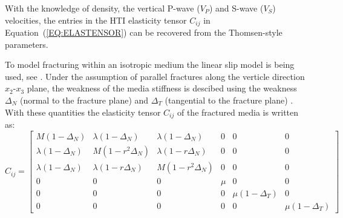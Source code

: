 \documentclass[review,authoryear]{elsarticle}
\begin{document}
With the knowledge of density, the vertical P-wave ($V_{P}$) and S-wave ($V_{S}$) velocities, the entries in the HTI elasticity tensor $C_{ij}$ in Equation~(\ref{EQ:ELASTENSOR}) can be recovered from the Thomsen-style parameters.

To model fracturing within an isotropic medium the linear slip model is being used, see \cite{schoenberg1980elastic}. Under the assumption of parallel fractures
along the verticle direction $x_{2}$-$x_{3}$ plane, the weakness of the media stiffness is descibed using the weakness $\Delta_N$ (normal to the fracture plane) and $\Delta_T$ (tangential to the fracture plane) \citep{bakulin2000estimation}. With these quantities the elasticity tensor $C_{ij}$ of the fractured media is written as:
\begin{equation}\label{EQ:FRACTENSOR}
  C_{ij} = \left[
  \begin{array}{cccccc}
M(1-\Delta_N) & \lambda(1-\Delta_N) & \lambda(1-\Delta_N) & 0 & 0 & 0 \\
\lambda(1-\Delta_N) & M(1-r^2\Delta_N) & \lambda(1-r\Delta_N) & 0 & 0 & 0 \\
\lambda(1-\Delta_N) & \lambda(1-r\Delta_N) & M(1-r^2\Delta_N) & 0 & 0 & 0 \\
 0 & 0 & 0 & \mu & 0 & 0 \\
 0 & 0 & 0 & 0 & \mu(1-\Delta_T) & 0 \\
 0 & 0 & 0 & 0 & 0 &  \mu(1-\Delta_T)
\end{array}
  \right]
\end{equation}  
\end{document}

